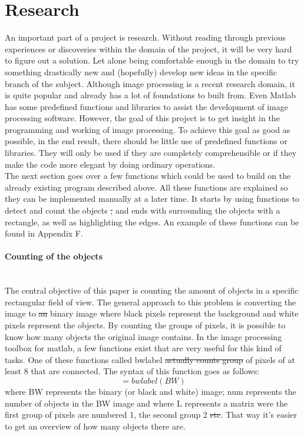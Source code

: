 \documentclass{article}
\providecommand{\DIFaddtex}[1]{{\protect\color{blue}\uwave{#1}}} %
\providecommand{\DIFdeltex}[1]{{\protect\color{red}\sout{#1}}}                      %
\providecommand{\DIFaddbegin}{} %
\providecommand{\DIFaddend}{} %
\providecommand{\DIFdelbegin}{} %
\providecommand{\DIFdelend}{} %
\providecommand{\DIFadd}[1]{\texorpdfstring{\DIFaddtex{#1}}{#1}} %
\providecommand{\DIFdel}[1]{\texorpdfstring{\DIFdeltex{#1}}{}} %
\newcommand{\DIFscaledelfig}{0.5}
\newlength{\DIFdelgraphicswidth} %
\newlength{\DIFdelgraphicsheight} %
\newcommand{\DIFaddincludegraphics}[2][]{{\color{blue}\fbox{\DIFOincludegraphics[#1]{#2}}}} %
\newcommand{\DIFdelincludegraphics}[2][]{%
\sbox{\DIFdelgraphicsbox}{\DIFOincludegraphics[#1]{#2}}%
\settoboxwidth{\DIFdelgraphicswidth}{\DIFdelgraphicsbox} %
\settoboxtotalheight{\DIFdelgraphicsheight}{\DIFdelgraphicsbox} %
\scalebox{\DIFscaledelfig}{%
\parbox[b]{\DIFdelgraphicswidth}{\usebox{\DIFdelgraphicsbox}\\[-\baselineskip] \rule{\DIFdelgraphicswidth}{0em}}\llap{\resizebox{\DIFdelgraphicswidth}{\DIFdelgraphicsheight}{%
\setlength{\unitlength}{\DIFdelgraphicswidth}%
\begin{picture}(1,1)%
\thicklines\linethickness{2pt} %
{\color[rgb]{1,0,0}\put(0,0){\framebox(1,1){}}}%
{\color[rgb]{1,0,0}\put(0,0){\line( 1,1){1}}}%
{\color[rgb]{1,0,0}\put(0,1){\line(1,-1){1}}}%
\end{picture}%
}\hspace*{3pt}}} %
} %
\DeclareRobustCommand{\DIFaddbegin}{\DIFOaddbegin \let\includegraphics\DIFaddincludegraphics} %
\DeclareRobustCommand{\DIFaddend}{\DIFOaddend \let\includegraphics\DIFOincludegraphics} %
\DeclareRobustCommand{\DIFdelbegin}{\DIFOdelbegin \let\includegraphics\DIFdelincludegraphics} %
\DeclareRobustCommand{\DIFdelend}{\DIFOaddend \let\includegraphics\DIFOincludegraphics} %
\begin{document}
\section*{Research}
An important part of a project is research. Without reading through previous experiences or discoveries within the domain of the project, it will be very hard to figure out a solution. Let alone being comfortable enough in the domain to try something drastically new and (hopefully) develop new ideas in the specific branch of the subject. Although image processing is a recent research domain, it is quite popular and already has a lot of foundations to built from. Even Matlab has some predefined functions and libraries to assist the development of image processing software.
However, the goal of this project is to get insight in the programming and working of image processing. To achieve this goal as good as possible, in the end result, there should be little use of predefined functions or libraries. They will only be used if they are completely comprehensible or if they make the code more elegant by doing ordinary operations. \DIFaddbegin \\
\DIFaddend The next section goes over a few functions which could be used to build on the already existing program described above. All these functions are explained so they can be implemented manually at a later time. It starts by using functions to detect and count the objects \DIFdelbegin \DIFdel{, }\DIFdelend and ends with surrounding the objects with a rectangle, as well as highlighting the edges. An example of these functions can be found in Appendix F.\DIFaddbegin \\
\DIFaddend 

\paragraph{Counting of the objects}\mbox{}\\
The central objective of this paper is counting the amount of objects in a specific rectangular field of view. The general approach to this problem is converting the image to \DIFdelbegin \DIFdel{an }\DIFdelend \DIFaddbegin \DIFadd{a }\DIFaddend binary image where black pixels represent the background and white pixels represent the objects. By counting the groups of pixels, it is possible to know how many objects the original image contains. In the image processing toolbox for matlab\cite{Mathworks}, a few functions exist that are very useful for this kind of tasks. One of these functions called bwlabel \DIFdelbegin \DIFdel{actually counts group }\DIFdelend \DIFaddbegin \DIFadd{counts groups }\DIFaddend of pixels of at least 8 that are connected. The syntax of this function goes as follows: 
\begin{equation}
[L, num] = bwlabel(BW)
\end{equation}
where BW represents the binary (or black and white) image; num represents the number of objects in the BW image and where L represents a matrix were the first group of pixels are numbered 1, the second group 2 \DIFdelbegin \DIFdel{etc}\DIFdelend \DIFaddbegin \DIFadd{and so on}\DIFaddend . That way it’s easier to get an overview of how many objects there are.
\end{document}
